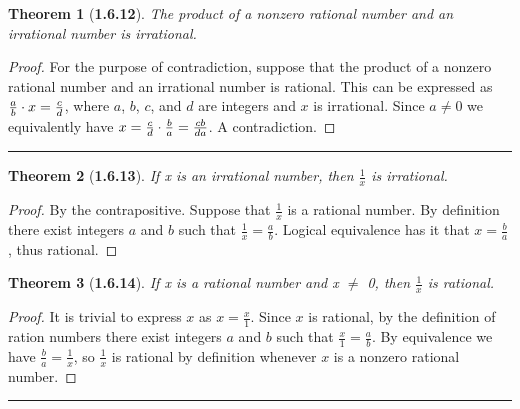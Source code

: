 \documentclass[a4paper, 12pt]{article}
\theoremstyle{plain}
\newtheorem*{theorem*}{Theorem}
\begin{document}
\begin{theorem*}[\textbf{1.6.12}]
    The product of a nonzero rational number and an irrational number is irrational.
\end{theorem*}

\begin{proof}
    For the purpose of contradiction, suppose that the product of a nonzero rational number and an 
    irrational number is rational. This can be expressed as 
    $\frac{a}{b} \space \cdot \space x = \frac{c}{d}$, where $a$, $b$, $c$, and $d$ are integers and $x$ 
    is irrational. Since $a \neq 0$ we equivalently have 
    $x = \frac{c}{d} \space \cdot \space \frac{b}{a} = \frac{cb}{da}$. A contradiction.
\end{proof}
\begin{center}
    \rule{5.4in}{1pt}
\end{center}


\begin{theorem*}[\textbf{1.6.13}]
    If x is an irrational number, then $\frac{1}{x}$ is irrational.
\end{theorem*}

\begin{proof}
    By the contrapositive. Suppose that $\frac{1}{x}$ is a rational number. By definition there exist 
    integers $a$ and $b$ such that  $\frac{1}{x} = \frac{a}{b}$. Logical equivalence has it that 
    $x = \frac{b}{a}$, thus rational.
\end{proof}

\pagebreak


\begin{theorem*}[\textbf{1.6.14}]
    If x is a rational number and x $\neq$ 0, then $\frac{1}{x}$ is rational.
\end{theorem*}

\begin{proof}
    It is trivial to express $x$ as $x = \frac{x}{1}$. Since $x$ is rational, by the definition of 
    ration numbers there exist integers $a$ and $b$ such that $\frac{x}{1} = \frac{a}{b}$. By 
    equivalence we have $\frac{b}{a} = \frac{1}{x}$, so $\frac{1}{x}$ is rational by definition 
    whenever $x$ is a nonzero rational number.
\end{proof}
\begin{center}
    \rule{5.4in}{1pt}
\end{center}
\end{document}
